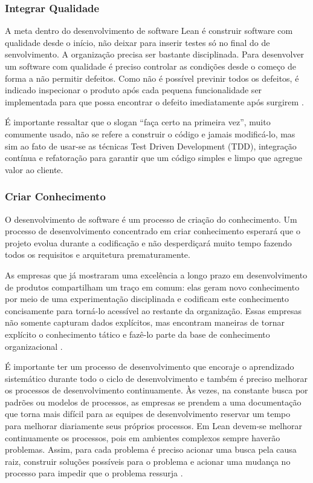 \subsubsection[Integrar Qualidade]{Integrar Qualidade}

A meta dentro do desenvolvimento de software Lean é construir software com qualidade desde o início, não deixar para inserir testes só no final do de senvolvimento. A organização precisa ser bastante disciplinada. Para desenvolver um software com qualidade é preciso controlar as condições desde o começo de forma a não permitir defeitos. Como não é possível previnir todos os defeitos, é indicado inspecionar o produto após cada pequena funcionalidade ser implementada para que possa encontrar o defeito imediatamente após surgirem \cite{poppendieck}.

É importante ressaltar que o slogan “faça certo na primeira vez”, muito comumente usado, não se refere a construir o código e jamais modificá-lo, mas sim ao fato de usar-se as técnicas Test Driven Development (TDD), integração contínua e refatoração para garantir que um código simples e limpo que agregue valor ao cliente. 

\subsubsection[Criar Conhecimento]{Criar Conhecimento}

O desenvolvimento de software é um processo de criação do conhecimento.  Um processo de desenvolvimento concentrado em criar conhecimento esperará que o projeto evolua durante a codificação e não desperdiçará muito tempo fazendo todos os requisitos e arquitetura prematuramente. 

As empresas que já mostraram uma excelência a longo prazo em desenvolvimento de produtos compartilham um traço em comum: elas geram novo conhecimento por meio de uma experimentação disciplinada e codificam este conhecimento concisamente para torná-lo acessível ao restante da organização. Essas empresas não somente capturam dados explícitos, mas encontram maneiras de tornar explícito o conhecimento tático e fazê-lo parte da base de conhecimento organizacional \cite{nonaka}.

É importante ter um processo de desenvolvimento que encoraje o aprendizado sistemático durante todo o ciclo de desenvolvimento e também é preciso melhorar os processos de desenvolvimento continuamente. Às vezes, na constante busca por padrões ou modelos de processos, as empresas se prendem a uma documentação que torna mais difícil para as equipes de desenvolvimento reservar um tempo para melhorar diariamente seus próprios processos. Em Lean devem-se melhorar continuamente os processos, pois em ambientes complexos sempre haverão problemas. Assim, para cada problema é preciso acionar uma busca pela causa raiz, construir soluções possíveis para o problema e acionar uma mudança no processo para impedir que o problema ressurja \cite{poppendieck}. 

